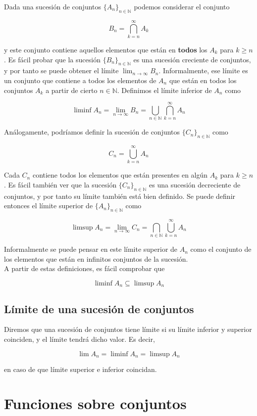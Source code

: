 \documentclass[12pt,a4paper]{book}
\begin{document}
Dada una sucesión de conjuntos $\{A_n\}_{n\in\mathbb{N} }$ podemos considerar el conjunto

$$ B_n = \bigcap_{k=n}^{\infty} A_k $$

y este conjunto contiene aquellos elementos que están en \textbf{todos} los $A_k$ para $k \geq n$. Es fácil probar que la sucesión $\{B_n\}_{n\in\mathbb{N}}$ es una sucesión creciente de conjuntos, y por tanto se puede obtener el límite $\lim_{n\to\infty} B_n$. Informalmente, ese límite es un conjunto que contiene a todos los elementos de $A_n$ que están en todos los conjuntos $A_k$ a partir de cierto $n\in\mathbb{N}$. Definimos el límite inferior de $A_n$ como

$$ \liminf A_n = \lim_{n\to\infty} B_n = \bigcup_{n\in\mathbb{N}} \bigcap_{k=n}^{\infty} A_n $$

Análogamente, podríamos definir la sucesión de conjuntos $\{C_n\}_{n\in\mathbb{N}}$ como

$$ C_n = \bigcup_{k=n}^{\infty} A_n $$

Cada $C_n$ contiene todos los elementos que están presentes en algún $A_k$ para $k \geq n$. Es fácil también ver que la sucesión $\{C_n\}_{n\in\mathbb{N}}$ es una sucesión decreciente de conjuntos, y por tanto su límite también está bien definido. Se puede definir entonces el límite superior de $\{A_n\}_{n\in\mathbb{N}}$ como

$$ \limsup A_n = \lim_{n\to\infty} C_n = \bigcap_{n\in\mathbb{N}} \bigcup_{k=n}^{\infty} A_n $$

Informalmente se puede pensar en este límite superior de $A_n$ como el conjunto de los elementos que están en infinitos conjuntos de la sucesión.\\

A partir de estas definiciones, es fácil comprobar que

$$ \liminf A_n \subseteq \limsup A_n $$

\subsection{Límite de una sucesión de conjuntos}

Diremos que una sucesión de conjuntos tiene límite si su límite inferior y superior coinciden, y el límite tendrá dicho  valor. Es decir,

$$ \lim A_n = \liminf A_n = \limsup A_n $$

en caso de que límite superior e inferior coincidan.

\section{Funciones sobre conjuntos}
\end{document}
